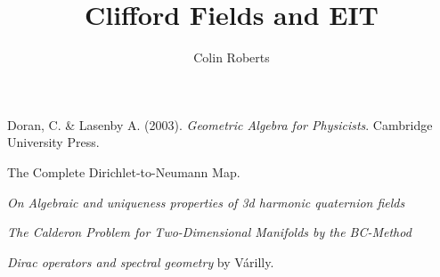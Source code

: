 \documentclass[12pt]{article}
\title{Clifford Fields and EIT}
\author{Colin Roberts}
\begin{document}






\newpage
\begin{thebibliography}{1}
	
	 Doran, C. \& Lasenby A. (2003). \emph{Geometric Algebra for Physicists}. Cambridge University Press.
	
	 The Complete Dirichlet-to-Neumann Map.
	
	 \emph{On Algebraic and uniqueness properties of 3d harmonic quaternion fields}
	
	 \emph{The Calderon Problem for Two-Dimensional Manifolds by the BC-Method}
	
	 \emph{Dirac operators and spectral geometry} by V\'arilly.
	
\end{thebibliography}
\end{document}
